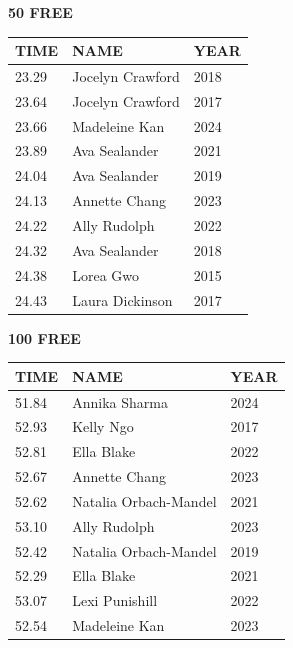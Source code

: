 \begin{table}[H]
\centering
\begin{minipage}[t]{0.48\textwidth}
\centering
\textbf{50 FREE}\\[0.1cm]
\begin{tabular}{@{}p{1.8cm}p{2.8cm}p{1.2cm}@{}}
\hline
    \textbf{TIME} & \textbf{NAME} & \textbf{YEAR} \\
\hline
    23.29 & Jocelyn Crawford & 2018 \\
    23.64 & Jocelyn Crawford & 2017 \\
    23.66 & Madeleine Kan & 2024 \\
    23.89 & Ava Sealander & 2021 \\
    24.04 & Ava Sealander & 2019 \\
    24.13 & Annette Chang & 2023 \\
    24.22 & Ally Rudolph & 2022 \\
    24.32 & Ava Sealander & 2018 \\
    24.38 & Lorea Gwo & 2015 \\
    24.43 & Laura Dickinson & 2017 \\
\hline
\end{tabular}
\end{minipage}\hfill
\begin{minipage}[t]{0.48\textwidth}
\centering
\textbf{100 FREE}\\[0.1cm]
\begin{tabular}{@{}p{1.8cm}p{2.8cm}p{1.2cm}@{}}
\hline
    \textbf{TIME} & \textbf{NAME} & \textbf{YEAR} \\
\hline
    51.84 & Annika Sharma & 2024 \\
    52.93 & Kelly Ngo & 2017 \\
    52.81 & Ella Blake & 2022 \\
    52.67 & Annette Chang & 2023 \\
    52.62 & Natalia Orbach-Mandel & 2021 \\
    53.10 & Ally Rudolph & 2023 \\
    52.42 & Natalia Orbach-Mandel & 2019 \\
    52.29 & Ella Blake & 2021 \\
    53.07 & Lexi Punishill & 2022 \\
    52.54 & Madeleine Kan & 2023 \\
\hline
\end{tabular}
\end{minipage}
\end{table}

